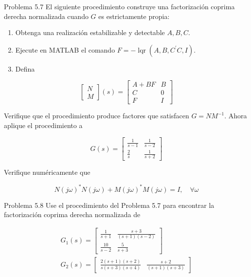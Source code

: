 Problema 5.7 El siguiente procedimiento construye una factorización coprima derecha normalizada cuando $G$ es estrictamente propia:

\begin{enumerate}
  \item Obtenga una realización estabilizable y detectable $A, B, C$.
  \item Ejecute en MATLAB el comando $F=-\operatorname{lqr}\left(A, B, C^{\prime} C, I\right)$.
  \item Defina
\end{enumerate}

$$
\left[\begin{array}{c}
N \\
M
\end{array}\right](s)=\left[\begin{array}{c|c}
A+B F & B \\
\hline C & 0 \\
F & I
\end{array}\right]
$$

Verifique que el procedimiento produce factores que satisfacen $G=N M^{-1}$. Ahora aplique el procedimiento a

$$
G(s)=\left[\begin{array}{cc}
\frac{1}{s-1} & \frac{1}{s-2} \\
\frac{2}{s} & \frac{1}{s+2}
\end{array}\right]
$$

Verifique numéricamente que


\begin{equation*}
N(j \omega)^{*} N(j \omega)+M(j \omega)^{*} M(j \omega)=I, \quad \forall \omega \tag{5.17}
\end{equation*}


Problema 5.8 Use el procedimiento del Problema 5.7 para encontrar la factorización coprima derecha normalizada de

$$
\begin{gathered}
G_{1}(s)=\left[\begin{array}{cc}
\frac{1}{s+1} & \frac{s+3}{(s+1)(s-2)} \\
\frac{10}{s-2} & \frac{5}{s+3}
\end{array}\right] \\
G_{2}(s)=\left[\begin{array}{ll}
\frac{2(s+1)(s+2)}{s(s+3)(s+4)} & \frac{s+2}{(s+1)(s+3)}
\end{array}\right]
\end{gathered}
$$

